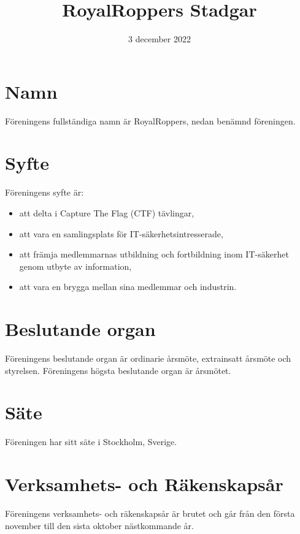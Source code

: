 \documentclass[a4paper,11pt]{article}
\title{RoyalRoppers Stadgar}
\date{3 december 2022}
\begin{document}
\maketitle
\newpage

\tableofcontents
\newpage

\section{Namn}
Föreningens fullständiga namn är RoyalRoppers, nedan benämnd föreningen.

\section{Syfte}
Föreningens syfte är:

\begin{itemize}
    \item att delta i Capture The Flag (CTF) tävlingar,
    \item att vara en samlingsplats för IT-säkerhetsintresserade,
    \item att främja medlemmarnas utbildning och fortbildning inom IT-säkerhet genom utbyte av information,
    \item att vara en brygga mellan sina medlemmar och industrin.
\end{itemize}

\section{Beslutande organ}
Föreningens beslutande organ är ordinarie årsmöte, extrainsatt årsmöte och styrelsen.
Föreningens högsta beslutande organ är årsmötet.

\section{Säte}
Föreningen har sitt säte i Stockholm, Sverige.

\section{Verksamhets- och Räkenskapsår}
Föreningens verksamhets- och räkenskapsår är brutet och går från den första november till den sista oktober nästkommande år.
\end{document}
